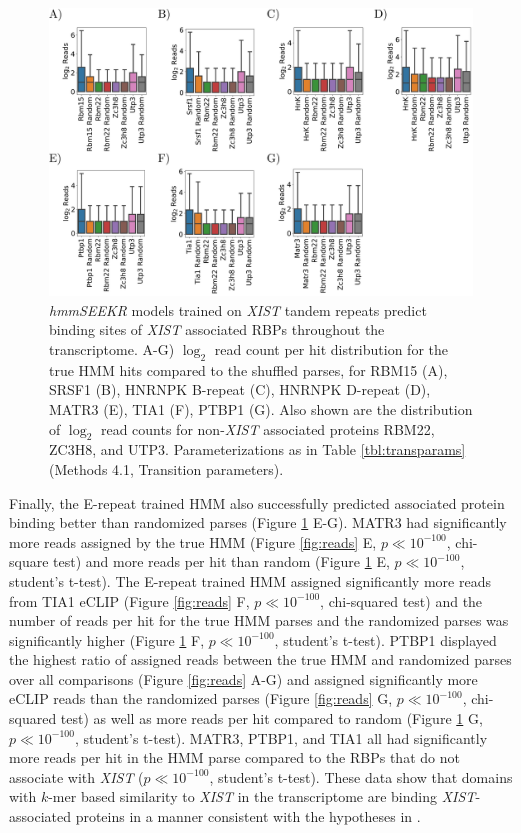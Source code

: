\begin{figure}[h!]
\centering
\includegraphics[width=.95\textwidth]{images/plot.pdf}
\caption[Transcriptome-wide prediction of RBP binding regions]{\emph{hmmSEEKR} models trained on \emph{XIST} tandem repeats predict binding sites of \textit{XIST} associated RBPs throughout the transcriptome. A-G) $\log_2$ read count per hit distribution for the true HMM hits compared to the shuffled parses, for RBM15 (A), SRSF1 (B), HNRNPK B-repeat (C), HNRNPK D-repeat (D), MATR3 (E), TIA1 (F), PTBP1 (G). Also shown are the distribution of $\log_2$ read counts for non-\textit{XIST} associated proteins RBM22, ZC3H8, and UTP3. Parameterizations as in Table \ref{tbl:transparams} (Methods 4.1, Transition parameters).}
\label{fig:transcriptome}
\end{figure}

Finally, the E-repeat trained HMM also successfully predicted associated protein binding better than randomized parses (Figure \ref{fig:transcriptome} E-G). MATR3 had significantly more reads assigned by the true HMM (Figure \ref{fig:reads} E, $p\ll 10^{-100}$, chi-square test) and more reads per hit than random (Figure \ref{fig:transcriptome} E, $p\ll 10^{-100}$, student's t-test). The E-repeat trained HMM assigned significantly more reads from TIA1 eCLIP (Figure \ref{fig:reads} F, $p\ll 10^{-100}$, chi-squared test) and the number of reads per hit for the true HMM parses and the randomized parses was significantly higher (Figure \ref{fig:transcriptome} F, $p\ll 10^{-100}$, student's t-test). PTBP1 displayed the highest ratio of assigned reads between the true HMM and randomized parses over all comparisons (Figure \ref{fig:reads} A-G) and assigned significantly more eCLIP reads than the randomized parses (Figure \ref{fig:reads} G, $p\ll10^{-100}$, chi-squared test) as well as more reads per hit compared to random (Figure \ref{fig:transcriptome} G, $p\ll10^{-100}$, student's t-test). MATR3, PTBP1, and TIA1 all had significantly more reads per hit in the HMM parse compared to the RBPs that do not associate with \textit{XIST} ($p\ll 10^{-100}$, student's t-test). These data show that domains with $k$-mer based similarity to \textit{XIST} in the transcriptome are binding \textit{XIST}-associated proteins in a manner consistent with the hypotheses in \cite{Kirk2018FunctionalContent,Sprague2019NonlinearDomains}.  

